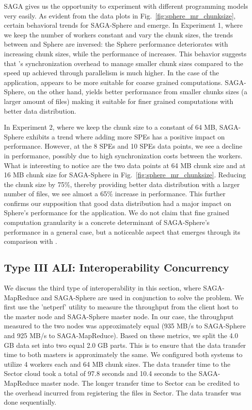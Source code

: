 \documentclass[3p,twocolumn]{elsarticle}
\begin{document}
SAGA gives us the opportunity to experiment with different programming
models very easily.  As evident from the data plots in
Fig.~\ref{fig:sphere_mr_chunksize}, certain behavioral trends for
SAGA-Sphere and \sagamapreduce emerge.  In Experiment 1, where we keep
the number of workers constant and vary the chunk sizes, the trends
between \sagamapreduce and Sphere are inversed: the Sphere performance
deteriorates with increasing chunk sizes, while the performance of
\sagamapreduce increases. This behavior suggests that \sagamapreduce's
synchronization overhead to manage smaller chunk sizes compared to the
speed up achieved through parallelism is much higher.  In the case of
the \wc application, \sagamapreduce appears to be more suitable for
coarse grained computations. SAGA-Sphere, on the other hand, yields
better performance from smaller chunks sizes (a larger amount of
files) making it suitable for finer grained computations with better
data distribution.

In Experiment 2, where we keep the chunk size to a constant of 64 MB,
SAGA-Sphere exhibits a trend where adding more SPEs has a positive
impact on performance. However, at the 8 SPEs and 10 SPEs data points,
we see a decline in performance, possibly due to high synchronization
costs between the workers. What is interesting to notice are the two
data points at 64 MB chunk size and at 16 MB chunk size for
SAGA-Sphere in Fig.~\ref{fig:sphere_mr_chunksize}.  Reducing the chunk
size by 75\%, thereby providing better data distribution with a larger
number of files, we see almost a 65\% increase in performance. This
further confirms our supposition that good data distribution had a
major impact on Sphere's performance for the \wc application. We do
not claim that fine grained computation granularity is a concrete
determinant of SAGA-Sphere's performance in a general case, but a
noticeable aspect that emerges through its comparison with
\sagamapreduce.


\subsection{Type III ALI: Interoperability Concurrency}

We discuss the third type of interoperability in this section,
where SAGA-MapReduce and SAGA-Sphere are used in conjunction 
to solve the \wc problem. We first use the 'netperf' 
utility to measure the throughput from the client host to 
the \sagamapreduce master node and SAGA-Sphere master node. 
In our case, the throughput measured to the two nodes was 
approximately equal (935 MB/s to SAGA-Sphere and 925 MB/s to SAGA-MapReduce). 
Based on these metrics, we split the 4.0 GB data set 
into two equal 2.0 GB parts. This is to ensure that the data 
transfer time to both masters is approximately the same. We 
configured both systems to utilize 4 workers each 
and 64 MB chunk sizes. The data transfer time to the Sector 
cloud took a total of 97.8 seconds and 10.4 seconds to the 
SAGA-MapReduce master node. The longer transfer time to Sector 
can be credited to the overhead incurred from registering 
the files in Sector. The data transfer was done sequentially. 
\end{document}
